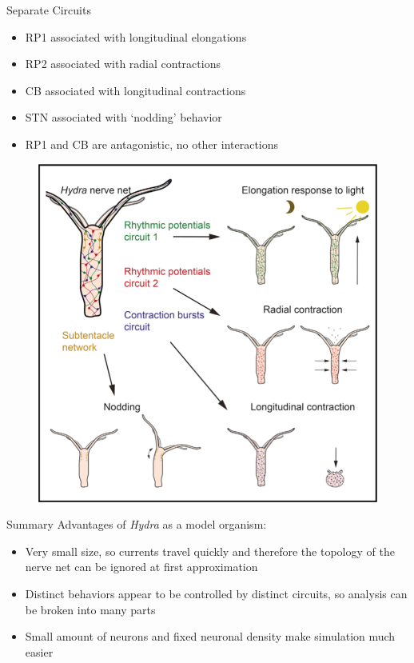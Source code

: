 \documentclass[leqno,presentation,unknownkeysallowed]{beamer}
\begin{document}
\begin{frame}{Separate Circuits}
\begin{itemize}
\item RP1 associated with longitudinal elongations
\item RP2 associated with radial contractions
\item CB associated with longitudinal contractions
\item STN associated with `nodding' behavior
\item RP1 and CB are antagonistic, no other interactions
\end{itemize}
\begin{figure}
\center
\includegraphics[scale=0.325]{hydra_movements.png}
\end{figure}
\end{frame}

\begin{frame}{Summary}
Advantages of \textit{Hydra} as a model organism:
\begin{itemize}
\item Very small size, so currents travel quickly and therefore the topology of the nerve net can be ignored at first approximation
\item Distinct behaviors appear to be controlled by distinct circuits, so analysis can be broken into many parts
\item Small amount of neurons and fixed neuronal density make simulation much easier
\end{itemize}
\end{frame}
\end{document}
